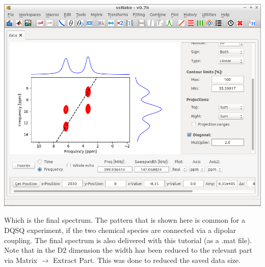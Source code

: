 \documentclass[11pt,a4paper]{article}
\begin{document}
\begin{center}
\includegraphics[width=0.7\linewidth]{Figs/Fig8.png}
\end{center}
Which is the final spectrum. The pattern that is shown here is common for a DQSQ experiment, if the
two chemical species are connected via a dipolar coupling. The final spectrum is also delivered with
this tutorial (as a .mat file). Note that in the D2 dimension the width has been reduced to the
relevant part via Matrix $\longrightarrow$ Extract Part. This was done to reduced the saved data
size.
\end{document}
